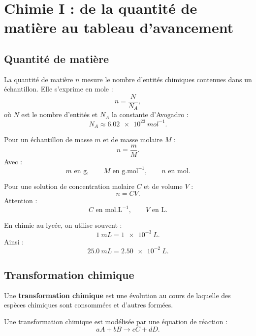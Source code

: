 \documentclass[11pt,a4paper]{article}
\begin{document}
\section{Chimie I : de la quantité de matière au tableau d'avancement}

\subsection{Quantité de matière}

\begin{definition}
La quantité de matière $n$ mesure le nombre d'entités chimiques contenues dans un échantillon.  
Elle s'exprime en mole :
\[
n=\frac{N}{N_A},
\]
où $N$ est le nombre d'entités et $N_A$ la constante d'Avogadro :
\[
N_A \approx \SI{6.02e23}{mol^{-1}}.
\]
\end{definition}

\begin{propriete}
Pour un échantillon de masse $m$ et de masse molaire $M$ :
\[
n=\frac{m}{M}.
\]
Avec :
\[
m \text{ en g}, \qquad M \text{ en g.mol}^{-1}, \qquad n \text{ en mol}.
\]
\end{propriete}

\begin{propriete}
Pour une solution de concentration molaire $C$ et de volume $V$ :
\[
n=CV.
\]
Attention :
\[
C \text{ en mol.L}^{-1}, \qquad V \text{ en L}.
\]
\end{propriete}

\begin{alerte}
En chimie au lycée, on utilise souvent :
\[
\SI{1}{mL}=\SI{1e-3}{L}.
\]
Ainsi :
\[
\SI{25.0}{mL}=\SI{2.50e-2}{L}.
\]
\end{alerte}

\subsection{Transformation chimique}

\begin{definition}
Une \textbf{transformation chimique} est une évolution au cours de laquelle des espèces chimiques sont consommées et d'autres formées.
\end{definition}

Une transformation chimique est modélisée par une équation de réaction :
\[
aA+bB \longrightarrow cC+dD.
\]
\end{document}

